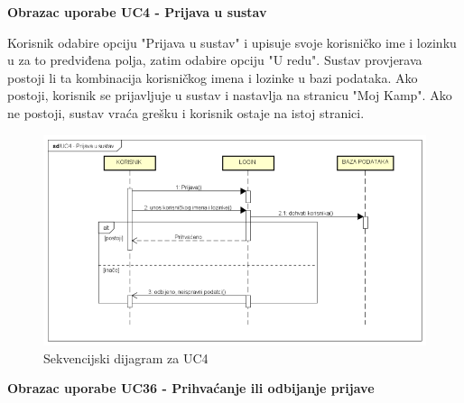 				\textbf{Obrazac uporabe UC4 - Prijava u sustav}

				\noindent Korisnik odabire opciju "Prijava u sustav" i upisuje svoje korisničko ime i lozinku u za to predviđena polja, zatim odabire opciju "U redu". Sustav provjerava postoji li ta kombinacija korisničkog imena i lozinke u bazi podataka. Ako postoji, korisnik se prijavljuje u sustav i nastavlja na stranicu "Moj Kamp". Ako ne postoji, sustav vraća grešku i korisnik ostaje na istoj stranici.

						
				\begin{figure}[H]
					\centerline{\includegraphics[width=\linewidth]{slike/Sekvencijski_dijagram_UC4.png}}
					\caption{Sekvencijski dijagram za UC4}
					\label{fig:sekvencijskiUC4}
				\end{figure}
				\eject
				
				\noindent\textbf{Obrazac uporabe UC36 - Prihvaćanje ili odbijanje prijave}
					
